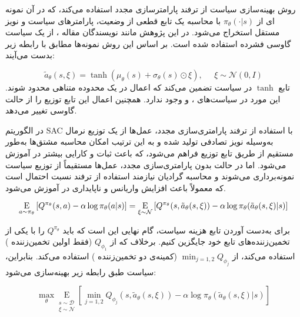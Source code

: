           روش بهینه‌سازی سیاست از ترفند پارامترسازی مجدد
           استفاده می‌کند، که در آن نمونه ای از 
           \(\pi_{\theta}(\cdot|s)\)
            با محاسبه یک تابع قطعی از وضعیت، پارامترهای سیاست و نویز مستقل استخراج می‌شود. در این پژوهش مانند نویسندگان مقاله 
            \cite{DBLP:journals/corr/abs-1801-01290}،
             از یک سیاست گاوسی
              فشرده استفاده شده است. بر اساس این روش نمونه‌ها مطابق با رابطه زیر بدست می‌آیند:
              
              \begin{equation}
              	\tilde{a}_{\theta}(s, \xi) = \tanh\left( \mu_{\theta}(s) + \sigma_{\theta}(s) \odot \xi \right), \;\;\;\;\; \xi \sim \mathcal{N}(0, I)
              \end{equation}
              تابع 
              \(\tanh\)
               در سیاست  تضمین می‌کند که اعمال در یک محدوده متناهی محدود شوند. این مورد در سیاست‌های ،  و  وجود ندارد. همچنین اعمال این تابع توزیع را از حالت گاوسی تغییر می‌دهد.
               
در الگوریتم SAC با استفاده از ترفند پارامتری‌سازی مجدد، عمل‌ها از یک توزیع نرمال به‌وسیله نویز تصادفی تولید شده و به این ترتیب امکان محاسبه مشتق‌ها به‌طور مستقیم از طریق تابع توزیع فراهم می‌شود، که باعث ثبات و کارایی بیشتر در آموزش می‌شود. اما در حالت بدون پارامتری‌سازی مجدد، عمل‌ها مستقیماً از توزیع سیاست نمونه‌برداری می‌شوند و محاسبه گرادیان نیازمند استفاده از ترفند نسبت احتمال است که معمولاً باعث افزایش واریانس و ناپایداری در آموزش می‌شود.

\begin{equation}
	\underset{a \sim \pi_{\theta}}{\mathrm{E}}\left[
	{Q^{\pi_{\theta}}(s,a) - \alpha \log \pi_{\theta}(a|s)} 
	\right]= \underset{\xi \sim \mathcal{N}}{\mathrm{E}}\left[
	{Q^{\pi_{\theta}}(s,\tilde{a}_{\theta}(s,\xi)) - \alpha \log \pi_{\theta}(\tilde{a}_{\theta}(s,\xi)|s)}
	\right]
\end{equation}

برای به‌دست آوردن تابع هزینه سیاست، گام نهایی این است که باید \( Q^{\pi_{\theta}} \) را با یکی از تخمین‌زننده‌های تابع خود جایگزین کنیم. برخلاف  که از \( Q_{\phi_1} \) (فقط اولین تخمین‌زننده ) استفاده می‌کند،  از \( \min_{j=1,2} Q_{\phi_j} \) (کمینه‌ی دو تخمین‌زننده ) استفاده می‌کند. بنابراین، سیاست طبق رابطه زیر بهینه‌سازی می‌شود:


\begin{equation}
	\max_{\theta}
	\underset{\substack{s \sim \mathcal{D} \\ \xi \sim \mathcal{N}}}{\mathrm{E}} 
	\left[
	{\min_{j=1,2} Q_{\phi_j}(s,\tilde{a}_{\theta}(s,\xi)) - \alpha \log \pi_{\theta}(\tilde{a}_{\theta}(s,\xi)|s)}
	\right]
\end{equation}

